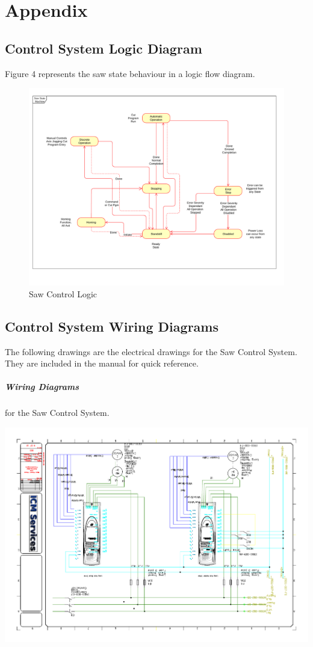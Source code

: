 
\chapter{Appendix}

\section{Control System Logic Diagram}
Figure 4 represents the saw state behaviour in a logic flow diagram.
\begin{figure}
		\centering
		\includegraphics[width=8in,angle=90]{../DRAWINGS/wo19011.pdf}
		\caption{Saw Control Logic}
		\label{fig:Saw-Logic}
\end{figure}
\pagebreak
\section{Control System Wiring Diagrams}
The following drawings are the electrical drawings for the Saw Control System. They are included in the manual for quick reference.
\paragraph*{Wiring Diagrams}for the Saw Control System.
\begin{center}
	\includegraphics[width=7.5in,angle=90]{../DRAWINGS/19011-008.pdf}
	\label{long:connections} %
\end{center}